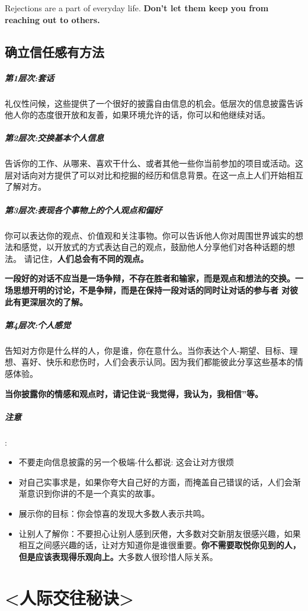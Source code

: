 \documentclass[UTF8,a4paper,8pt]{ctexbook}
\begin{document}
			Rejections are a part of everyday life. \textbf{Don't let them keep you from reaching out to others.}
			
		\subsection{确立信任感有方法}
			\subparagraph{第1层次:套话}礼仪性问候，这些提供了一个很好的披露自由信息的机会。低层次的信息披露告诉他人你的态度很开放和友善，如果环境允许的话，你可以和他继续对话。
			
			\subparagraph{第2层次:交换基本个人信息}告诉你的工作、从哪来、喜欢干什么、或者其他一些你当前参加的项目或活动。这层对话向对方提供了可以对比和挖掘的经历和信息背景。在这一点上人们开始相互了解对方。
			
			\subparagraph{第3层次:表现各个事物上的个人观点和偏好}你可以表达你的观点、价值观和关注事物。你可以告诉他人你对周围世界诚实的想法和感觉，以开放式的方式表达自己的观点，鼓励他人分享他们对各种话题的想法。 请记住，\textbf{人们总会有不同的观点。}
			
			\textbf{一段好的对话不应当是一场争辩，不存在胜者和输家，而是观点和想法的交换。一场思想开明的讨论，不是争辩，而是在保持一段对话的同时让对话的参与者 对彼此有更深层次的了解。}
			
			
			\subparagraph{第4层次:个人感觉}告知对方你是什么样的人，你是谁，你在意什么。当你表达个人-期望、目标、理想、喜好、快乐和悲伤时，人们会表示认同。因为我们都能彼此分享这些基本的情感体验。
			
			\textbf{当你披露你的情感和观点时，请记住说“我觉得，我认为，我相信”等。}
			
			\subparagraph{注意}:
				\begin{itemize}
					\item 不要走向信息披露的另一个极端-什么都说: 这会让对方很烦
					\item 对自己实事求是，如果你夸大自己好的方面，而掩盖自己错误的话，人们会渐渐意识到你讲的不是一个真实的故事。
					\item 展示你的目标：你会惊喜的发现大多数人表示共鸣。
					\item 让别人了解你：不要担心让别人感到厌倦，大多数对交新朋友很感兴趣，如果相互之间感兴趣的话，让对方知道你是谁很重要。\textbf{你不需要取悦你见到的人，但是应该表现得乐观向上。}大多数人很珍惜人际关系。
				\end{itemize}
			
	\section{<人际交往秘诀>}
	
\end{document}
